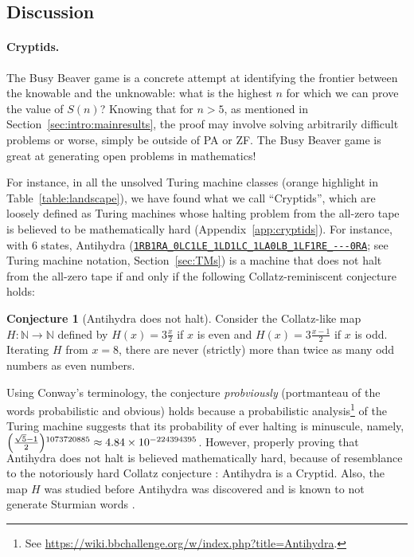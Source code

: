 \documentclass[a4paper,british]{article}
\theoremstyle{definition} %
\newtheorem{conjecture}{Conjecture}[section]
\numberwithin{equation}{section}
\theoremstyle{definition} %
\newcommand{\tm}[1]{\href{https://bbchallenge.org/#1}{\texttt{\nolinkurl{#1}}}}
\begin{document}
\subsection{Discussion}\label{sec:intro:discuss}

\paragraph{Cryptids.} The Busy Beaver game is a concrete attempt at identifying the frontier between the knowable and the unknowable: what is the highest $n$ for which we can prove the value of $S(n)$? Knowing that for $n > 5$, as mentioned in Section~\ref{sec:intro:mainresults}, the proof may involve solving arbitrarily difficult problems or worse, simply be outside of PA or ZF. The Busy Beaver game is great at generating open problems in mathematics!


For instance, in all the unsolved Turing machine classes (orange highlight in Table~\ref{table:landscape}), we have found what we call ``Cryptids'', which are loosely defined as Turing machines whose halting problem from the all-zero tape is believed to be mathematically hard (Appendix~\ref{app:cryptids}). For instance, with 6 states, Antihydra (\tm{1RB1RA_0LC1LE_1LD1LC_1LA0LB_1LF1RE_---0RA}; see Turing machine notation, Section~\ref{sec:TMs}) is a machine that does not halt from the all-zero tape if and only if the following Collatz-reminiscent conjecture holds:


\begin{conjecture}[Antihydra does not halt]
    Consider the Collatz-like map $H: \mathbb{N} \to \mathbb{N}$ defined by $H(x) = 3\frac{x}{2}$ if $x$ is even and $H(x) = 3\frac{x-1}{2}$ if $x$ is odd. Iterating $H$ from $x=8$, there are never (strictly) more than twice as many odd numbers as even numbers.
\end{conjecture}

Using Conway's terminology, the conjecture \textit{probviously} (portmanteau of the words probabilistic and obvious) holds because a probabilistic analysis\footnote{See \url{https://wiki.bbchallenge.org/w/index.php?title=Antihydra}.} of the Turing machine suggests that its probability of ever halting is minuscule, namely, $\smash{\left(\frac{\sqrt{5}-1}{2}\right)}^{1073720885}\approx 4.84\times 10^{-224394395}$. However, properly proving that Antihydra does not halt is believed mathematically hard, because of resemblance to the notoriously hard Collatz conjecture \cite{LagariasCollatz}: Antihydra is a Cryptid. Also, the map $H$ was studied before Antihydra was discovered and is known to not generate Sturmian words \cite{DUBICKAS_2009}.
\end{document}
